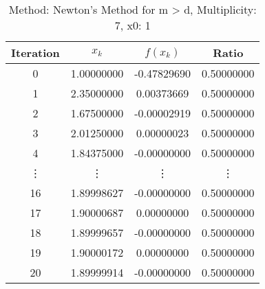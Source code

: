 \begin{table}
\centering
\caption{Method: Newton's Method for m > d, Multiplicity: 7, x0: 1}
\label{tab:table_Newton's_Method_for_m_>_d_7_1}
\begin{tabular}{c c c c}
\toprule
Iteration &      $x_k$ &    $f(x_k)$ &      Ratio \\
\midrule
        0 & 1.00000000 & -0.47829690 & 0.50000000 \\
        1 & 2.35000000 &  0.00373669 & 0.50000000 \\
        2 & 1.67500000 & -0.00002919 & 0.50000000 \\
        3 & 2.01250000 &  0.00000023 & 0.50000000 \\
        4 & 1.84375000 & -0.00000000 & 0.50000000 \\
   \vdots &     \vdots &      \vdots &     \vdots \\
       16 & 1.89998627 & -0.00000000 & 0.50000000 \\
       17 & 1.90000687 &  0.00000000 & 0.50000000 \\
       18 & 1.89999657 & -0.00000000 & 0.50000000 \\
       19 & 1.90000172 &  0.00000000 & 0.50000000 \\
       20 & 1.89999914 & -0.00000000 & 0.50000000 \\
\bottomrule
\end{tabular}
\end{table}
